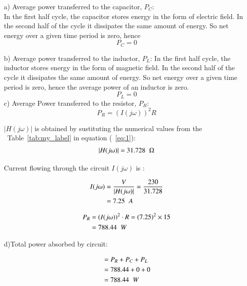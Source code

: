 \documentclass[journal,12pt,twocolumn]{IEEEtran}
\newcommand\tabref{Table~\ref}
\providecommand{\brak}[1]{\ensuremath{\left(#1\right)}}
\theoremstyle{remark}
\begin{document}
a) Average power transferred to the capacitor, $P_C$:
\\ In the first half cycle, the capacitor stores energy in the form of electric field. In the second half of the cycle it dissipates the same amount of energy. So net energy over a given time period is zero, hence 
\begin{equation}
	P_C = 0
\end{equation}	
  
b) Average power transferred to the inductor, $P_L$:
In the first half cycle, the inductor stores energy in the form of magnetic field. In the second half of the cycle it dissipates the same amount of energy. So net energy over a given time period is zero, hence the average power of an inductor is zero.
\begin{equation}
	P_L = 0
\end{equation}
c) Average Power transferred to the resistor, $P_R$:
\begin{equation}
	P_R = (I(j\omega))^2R
\end{equation} 


$|H(j\omega)|$ is obtained by sustituting the numerical values from the ~\tabref{tab:my_label} in equation (~\ref{eq:1}):
 \begin{align}
 |H(j\omega)|=31.728\hspace{0.2cm}\ohm
\end{align}	

Current flowing through the circuit $I(j\omega)$ is :

\begin{align}
	I(j\omega)&=\frac{V}{|H(j\omega)|}=\frac{230}{31.728}
	\\&=7.25\hspace{0.2cm}A
\end{align}

\begin{align}
	P_R &= (I(j\omega))^2\cdot R = \brak{7.25}^2 \times 15
	\\&=788.44\hspace{0.2cm}W
\end{align}

d)Total power absorbed by circuit:

\begin{align}
	&= P_R + P_C + P_L
	\\&= 788.44 + 0 + 0
	\\&= 788.44\hspace{0.2cm}W
\end{align}
\end{document}
